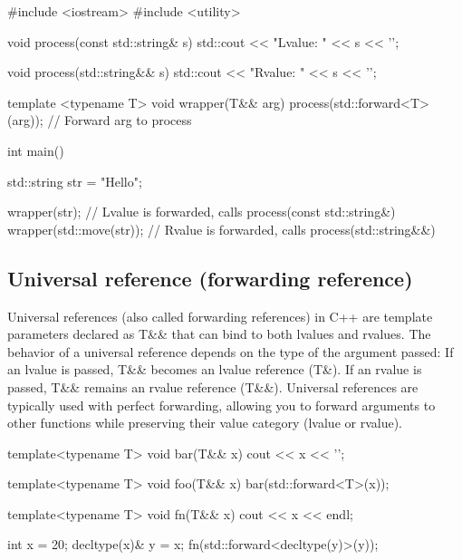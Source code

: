 \documentclass{report}
\begin{document}
     \pagebreak \bigbreak \noindent 
     \begin{cppcode}
         #include <iostream>
         #include <utility>

         void process(const std::string& s) {
             std::cout << "Lvalue: " << s << '\n';
         }

         void process(std::string&& s) {
             std::cout << "Rvalue: " << s << '\n';
         }

         template <typename T>
         void wrapper(T&& arg) {
             process(std::forward<T>(arg));  // Forward arg to process
         }

         int main() {
             std::string str = "Hello";

             wrapper(str);            // Lvalue is forwarded, calls process(const std::string&)
             wrapper(std::move(str)); // Rvalue is forwarded, calls process(std::string&&)
         }

     \end{cppcode}

     \pagebreak 
     \subsection{Universal reference (forwarding reference)}
     \bigbreak \noindent 
     Universal references (also called forwarding references) in C++ are template parameters declared as T\&\& that can bind to both lvalues and rvalues. The behavior of a universal reference depends on the type of the argument passed:
     \bigbreak \noindent 
     If an lvalue is passed, T\&\& becomes an lvalue reference (T\&).
    If an rvalue is passed, T\&\& remains an rvalue reference (T\&\&).
    \bigbreak \noindent 
    Universal references are typically used with perfect forwarding, allowing you to forward arguments to other functions while preserving their value category (lvalue or rvalue).
    \bigbreak \noindent 
    \begin{cppcode}
    template<typename T>
    void bar(T&& x) {
        cout << x << '\n';
    }

    template<typename T>
    void foo(T&& x) {
        bar(std::forward<T>(x));
    }

    template<typename T>
    void fn(T&& x) {
        cout << x << endl;
    }

    int x = 20;
    decltype(x)& y = x;
    fn(std::forward<decltype(y)>(y));
    \end{cppcode}
\end{document}
